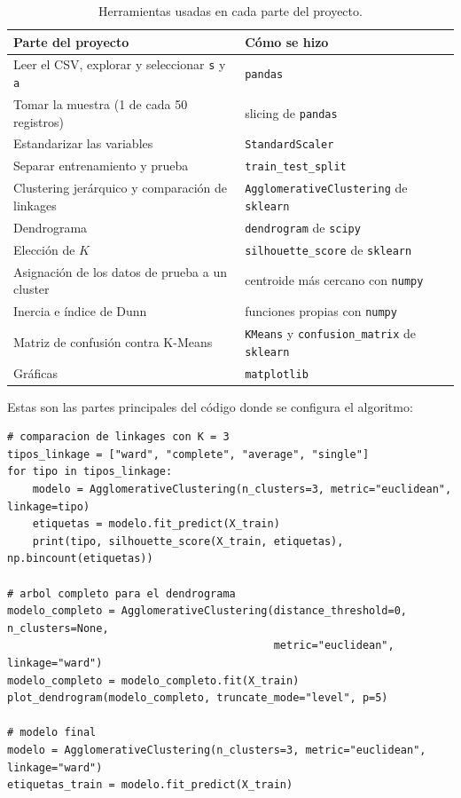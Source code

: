 \documentclass[11pt,a4paper]{article}
\begin{document}
\begin{table}[H]
  \centering
  \begin{tabular}{p{8.3cm}p{6.2cm}}
    \toprule
    Parte del proyecto & Cómo se hizo \\
    \midrule
    Leer el CSV, explorar y seleccionar \texttt{s} y \texttt{a} & \texttt{pandas} \\
    Tomar la muestra (1 de cada 50 registros) & slicing de \texttt{pandas} \\
    Estandarizar las variables & \texttt{StandardScaler} \\
    Separar entrenamiento y prueba & \texttt{train\_test\_split} \\
    Clustering jerárquico y comparación de linkages & \texttt{AgglomerativeClustering} de \texttt{sklearn} \\
    Dendrograma & \texttt{dendrogram} de \texttt{scipy} \\
    Elección de $K$ & \texttt{silhouette\_score} de \texttt{sklearn} \\
    Asignación de los datos de prueba a un cluster & centroide más cercano con \texttt{numpy} \\
    Inercia e índice de Dunn & funciones propias con \texttt{numpy} \\
    Matriz de confusión contra K-Means & \texttt{KMeans} y \texttt{confusion\_matrix} de \texttt{sklearn} \\
    Gráficas & \texttt{matplotlib} \\
    \bottomrule
  \end{tabular}
  \caption{Herramientas usadas en cada parte del proyecto.}
  \label{tab:herramientas}
\end{table}

Estas son las partes principales del código donde se configura el algoritmo:

\begin{lstlisting}
# comparacion de linkages con K = 3
tipos_linkage = ["ward", "complete", "average", "single"]
for tipo in tipos_linkage:
    modelo = AgglomerativeClustering(n_clusters=3, metric="euclidean", linkage=tipo)
    etiquetas = modelo.fit_predict(X_train)
    print(tipo, silhouette_score(X_train, etiquetas), np.bincount(etiquetas))

# arbol completo para el dendrograma
modelo_completo = AgglomerativeClustering(distance_threshold=0, n_clusters=None,
                                          metric="euclidean", linkage="ward")
modelo_completo = modelo_completo.fit(X_train)
plot_dendrogram(modelo_completo, truncate_mode="level", p=5)

# modelo final
modelo = AgglomerativeClustering(n_clusters=3, metric="euclidean", linkage="ward")
etiquetas_train = modelo.fit_predict(X_train)
\end{lstlisting}
\end{document}
